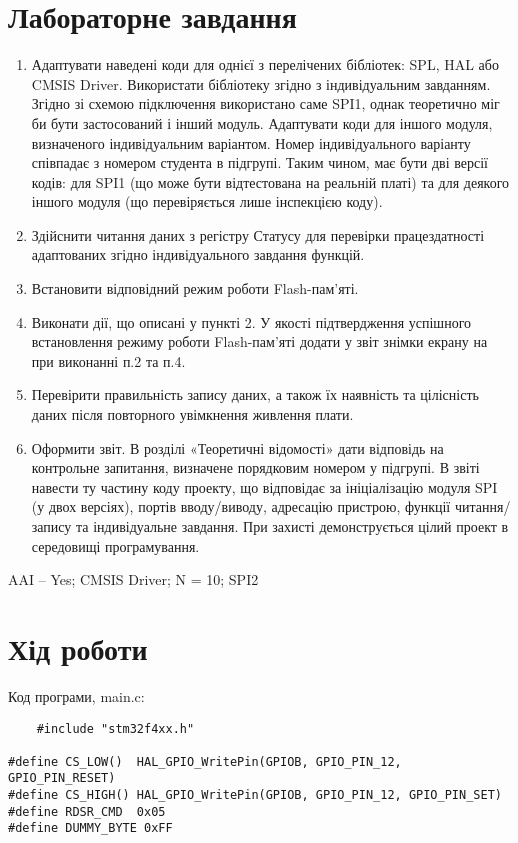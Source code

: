 \documentclass[oneside,14pt]{extarticle}
\begin{document}
\begin{normalsize}
  \section*{Лабораторне завдання}
  \begin{enumerate}
  	\item Адаптувати наведені коди для однієї з перелічених бібліотек: SPL, HAL або
CMSIS Driver. Використати бібліотеку згідно з індивідуальним завданням.
Згідно зі схемою підключення використано саме SPI1, однак теоретично міг
би бути застосований і інший модуль. Адаптувати коди для іншого модуля,
визначеного індивідуальним варіантом. Номер індивідуального варіанту
співпадає з номером студента в підгрупі. Таким чином, має бути дві версії
кодів: для SPI1 (що може бути відтестована на реальній платі) та для
деякого іншого модуля (що перевіряється лише інспекцією коду).
  \item Здійснити читання даних з регістру Статусу для перевірки працездатності
адаптованих згідно індивідуального завдання функцій.
  \item Встановити відповідний режим роботи Flash-пам'яті.
  \item Виконати дії, що описані у пункті 2. У якості підтвердження успішного
встановлення режиму роботи Flash-пам'яті додати у звіт знімки екрану на
при виконанні п.2 та п.4.
  \item Перевірити правильність запису даних, а також їх наявність та цілісність
даних після повторного увімкнення живлення плати.
  \item Оформити звіт. В розділі «Теоретичні відомості» дати відповідь на
контрольне запитання, визначене порядковим номером у підгрупі. В звіті
навести ту частину коду проекту, що відповідає за ініціалізацію модуля SPI
(у двох версіях), портів вводу/виводу, адресацію пристрою, функції
читання/запису та індивідуальне завдання. При захисті демонструється
цілий проект в середовищі програмування.
  \end{enumerate}
  
  AAI – Yes; CMSIS Driver; N = 10; SPI2
  
  \section*{Хід роботи}
  
  Код програми, main.c:
  
	{\small\begin{lstlisting}
	#include "stm32f4xx.h"

#define CS_LOW()  HAL_GPIO_WritePin(GPIOB, GPIO_PIN_12, GPIO_PIN_RESET)
#define CS_HIGH() HAL_GPIO_WritePin(GPIOB, GPIO_PIN_12, GPIO_PIN_SET)
#define RDSR_CMD  0x05
#define DUMMY_BYTE 0xFF


\end{lstlisting}}
\end{normalsize}
\end{document}
